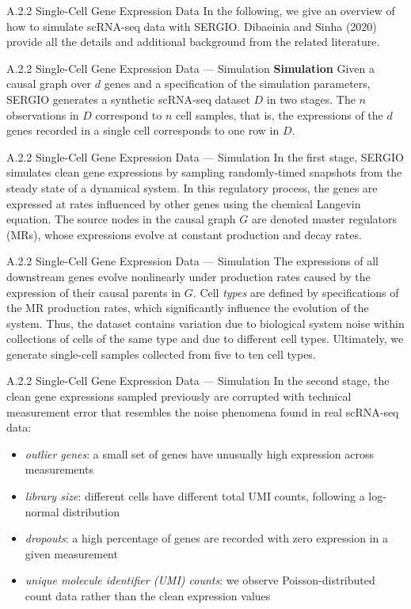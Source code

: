 \documentclass[aspectratio=169,10pt]{beamer}
\newcommand{\scrna}{{scRNA-seq}\xspace}
\newcommand{\sergio}{{SERGIO}\xspace}
\begin{document}
\begin{frame}{A.2.2 Single-Cell Gene Expression Data}
In the following, we give an overview of how to simulate \scrna data with \sergio. Dibaeinia and Sinha (2020) provide all the details and additional background from the related literature.
\end{frame}

\begin{frame}{A.2.2 Single-Cell Gene Expression Data --- Simulation}
\textbf{Simulation}\quad
Given a causal graph over $d$ genes and a specification of the simulation parameters, \sergio generates a synthetic scRNA-seq dataset $D$ in two stages. The $n$ observations in $D$ correspond to $n$ cell samples, that is, the expressions of the $d$ genes recorded in a single cell corresponds to one row in $D$.
\end{frame}

\begin{frame}{A.2.2 Single-Cell Gene Expression Data --- Simulation}
\small
In the first stage, \sergio simulates clean gene expressions by sampling randomly-timed snapshots from the steady state of a dynamical system. In this regulatory process, the genes are expressed at rates influenced by other genes using the chemical Langevin equation. The source nodes in the causal graph $G$ are denoted master regulators (MRs), whose expressions evolve at constant production and decay rates.
\end{frame}

\begin{frame}{A.2.2 Single-Cell Gene Expression Data --- Simulation}
\small
The expressions of all downstream genes evolve nonlinearly under production rates caused by the expression of their causal parents in $G$. Cell {\em types} are defined by specifications of the MR production rates, which significantly influence the evolution of the system. Thus, the dataset contains variation due to biological system noise within collections of cells of the same type and due to different cell types. Ultimately, we generate single-cell samples collected from five to ten cell types.
\end{frame}

\begin{frame}{A.2.2 Single-Cell Gene Expression Data --- Simulation}
In the second stage, the clean gene expressions sampled previously are corrupted with technical measurement error that resembles the noise phenomena found in real \scrna data:
\begin{itemize}
    \item {\em outlier genes}: a small set of genes have unusually high expression across measurements
    \item {\em library size}: different cells have different total UMI counts, following a log-normal distribution
    \item {\em dropouts}: a high percentage of genes are recorded with zero expression in a given measurement
    \item {\em unique molecule identifier (UMI) counts}: we observe Poisson-distributed count data rather than the clean expression values
\end{itemize}
\end{frame}
\end{document}
